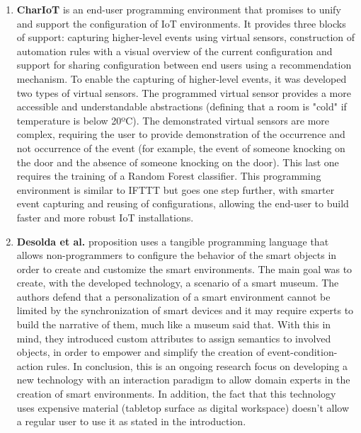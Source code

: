 \begin{enumerate}
    \item \textbf{CharIoT} \cite{chariot} is an end-user programming environment that promises to unify and support the configuration of IoT environments. It provides three blocks of support: capturing higher-level events using virtual sensors, construction of automation rules with a visual overview of the current configuration and support for sharing configuration between end users using a recommendation mechanism. To enable the capturing of higher-level events, it was developed two types of virtual sensors. The programmed virtual sensor provides a more accessible and understandable abstractions (defining that a room is "cold" if temperature is below 20ºC). The demonstrated virtual sensors are more complex, requiring the user to provide demonstration of the occurrence and not occurrence of the event (for example, the event of someone knocking on the door and the absence of someone knocking on the door). This last one requires the training of a Random Forest classifier. This programming environment is similar to IFTTT but goes one step further, with smarter event capturing and reusing of configurations, allowing the end-user to build faster and more robust IoT installations.
    \item \textbf{Desolda et al.} \cite{desolda} proposition uses a tangible programming language that allows non-programmers to configure the behavior of the smart objects in order to create and customize the smart environments. The main goal was to create, with the developed technology, a scenario of a smart museum. The authors defend that a personalization of a smart environment cannot be limited by the synchronization of smart devices and it may require experts to build the narrative of them, much like a museum said that. With this in mind, they introduced custom attributes to assign semantics to involved objects, in order to empower and simplify the creation of event-condition-action rules. In conclusion, this is an ongoing research focus on developing a new technology with an interaction paradigm to allow domain experts in the creation of smart environments. In addition, the fact that this technology uses expensive material (tabletop surface as digital workspace) doesn’t allow a regular user to use it as stated in the introduction.

\end{enumerate}
